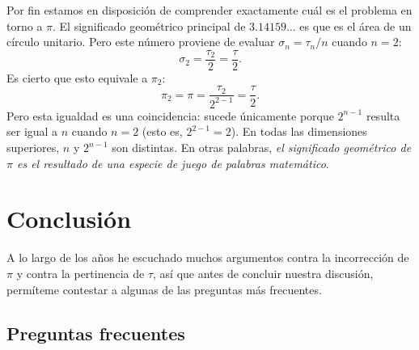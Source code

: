 Por fin estamos en disposición de comprender exactamente cuál es el problema en torno a $\pi$. El significado geométrico principal de $3.14159\ldots$ es que es el área de un círculo unitario. Pero este número proviene de evaluar $\sigma_n = \tau_n/n$ cuando $n=2$:
\[
\sigma_2 = \frac{\tau_2}{2} = \frac{\tau}{2}.
\]
Es cierto que esto equivale a $\pi_2$:
\[
\pi_2 = \pi = \frac{\tau_2}{2^{2-1}} = \frac{\tau}{2}.
\]
Pero esta igualdad es una coincidencia: sucede únicamente porque $2^{n-1}$ resulta ser igual a $n$ cuando $n=2$ (esto es, $2^{2-1} = 2$). En todas las dimensiones superiores, $n$ y $2^{n-1}$ son distintas. En otras palabras, \emph{el significado geométrico de $\pi$ es el resultado de una especie de juego de palabras matemático}.



\section{Conclusión}
\label{sec:conclusion}

A lo largo de los años he escuchado muchos argumentos contra la incorrección de $\pi$ y contra la pertinencia de $\tau$, así que antes de concluir nuestra discusión, permíteme contestar a algunas de las preguntas más frecuentes.

  \subsection{Preguntas frecuentes} %
  \label{sec:faq}


